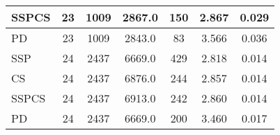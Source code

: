 \documentclass{article}
\begin{document}
\begin{table}[H]
{\begin{tabular}{|l|c|c|c|c|c|c|}
SSPCS              & 23             & 1009              & 2867.0                 & 150            & 2.867                     & 0.029                                   \\ \hline
PD                 & 23             & 1009              & 2843.0                 & 83             & 3.566                     & 0.036                                   \\ \hline
SSP                & 24             & 2437              & 6669.0                 & 429            & 2.818                     & 0.014                                   \\ \hline
CS                 & 24             & 2437              & 6876.0                 & 244            & 2.857                     & 0.014                                   \\ \hline
SSPCS              & 24             & 2437              & 6913.0                 & 242            & 2.860                     & 0.014                                   \\ \hline
PD                 & 24             & 2437              & 6669.0                 & 200            & 3.460                     & 0.017                                   \\ \hline
\end{tabular}%
}
\label{tab:simulation2_set4_algorithm_metrics}
\end{table}


\begin{table}[H]
\centering
\caption{Simulation 2, Set 5: Graph Characteristics}
\label{tab:simulation2_set5_graph_characteristics}
\end{table}
\end{document}
